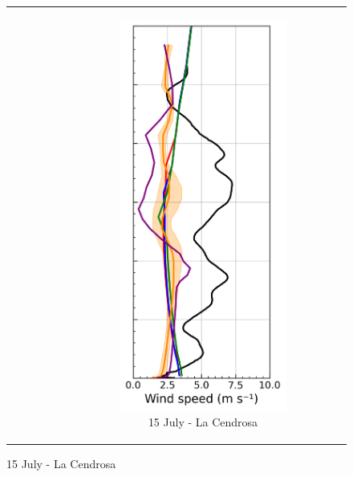 \begin{figure}[hbtp]
{\begin{tabular}{@{}cccc@{}}
\begin{subfigure}[t]{0.289\textwidth}
        \end{subfigure} &
        \begin{subfigure}[t]{0.283\textwidth}
            \caption{15 July - La Cendrosa}
            \includegraphics[width=\textwidth]{images/chap6/profiles/profile_cendrosa_wind_speed_1507_.png}

\end{subfigure}
\end{tabular}}
\end{figure}
